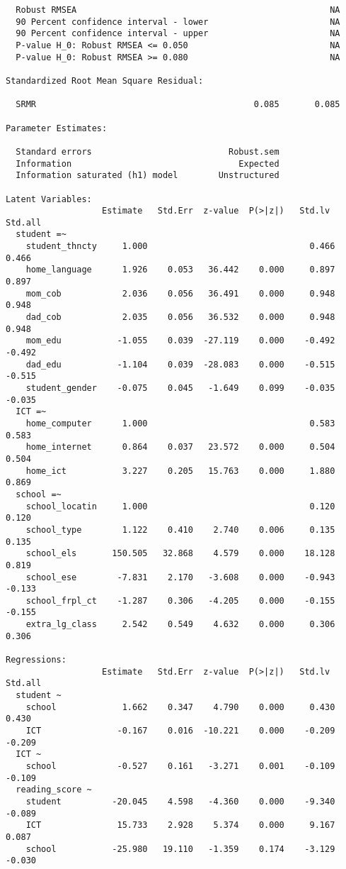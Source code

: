 \documentclass[
]{article}
\begin{document}
\begin{verbatim}
  Robust RMSEA                                                  NA
  90 Percent confidence interval - lower                        NA
  90 Percent confidence interval - upper                        NA
  P-value H_0: Robust RMSEA <= 0.050                            NA
  P-value H_0: Robust RMSEA >= 0.080                            NA

Standardized Root Mean Square Residual:

  SRMR                                           0.085       0.085

Parameter Estimates:

  Standard errors                           Robust.sem
  Information                                 Expected
  Information saturated (h1) model        Unstructured

Latent Variables:
                   Estimate   Std.Err  z-value  P(>|z|)   Std.lv   Std.all
  student =~                                                              
    student_thncty     1.000                                0.466    0.466
    home_language      1.926    0.053   36.442    0.000     0.897    0.897
    mom_cob            2.036    0.056   36.491    0.000     0.948    0.948
    dad_cob            2.035    0.056   36.532    0.000     0.948    0.948
    mom_edu           -1.055    0.039  -27.119    0.000    -0.492   -0.492
    dad_edu           -1.104    0.039  -28.083    0.000    -0.515   -0.515
    student_gender    -0.075    0.045   -1.649    0.099    -0.035   -0.035
  ICT =~                                                                  
    home_computer      1.000                                0.583    0.583
    home_internet      0.864    0.037   23.572    0.000     0.504    0.504
    home_ict           3.227    0.205   15.763    0.000     1.880    0.869
  school =~                                                               
    school_locatin     1.000                                0.120    0.120
    school_type        1.122    0.410    2.740    0.006     0.135    0.135
    school_els       150.505   32.868    4.579    0.000    18.128    0.819
    school_ese        -7.831    2.170   -3.608    0.000    -0.943   -0.133
    school_frpl_ct    -1.287    0.306   -4.205    0.000    -0.155   -0.155
    extra_lg_class     2.542    0.549    4.632    0.000     0.306    0.306

Regressions:
                   Estimate   Std.Err  z-value  P(>|z|)   Std.lv   Std.all
  student ~                                                               
    school             1.662    0.347    4.790    0.000     0.430    0.430
    ICT               -0.167    0.016  -10.221    0.000    -0.209   -0.209
  ICT ~                                                                   
    school            -0.527    0.161   -3.271    0.001    -0.109   -0.109
  reading_score ~                                                         
    student          -20.045    4.598   -4.360    0.000    -9.340   -0.089
    ICT               15.733    2.928    5.374    0.000     9.167    0.087
    school           -25.980   19.110   -1.359    0.174    -3.129   -0.030


\end{verbatim}
\end{document}
